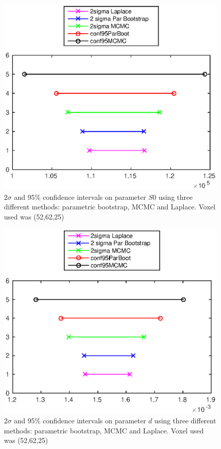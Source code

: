 \documentclass[11pt,a4paper,oneside]{report}
\begin{document}
\begin{figure}[H]
      \centering
    \includegraphics[scale=1]{figures/q2/q123-p1.eps}
    \caption{$2\sigma$ and 95\% confidence intervals on parameter $S0$ using three different methods: parametric bootstrap, MCMC and Laplace. Voxel used was (52,62,25) }
    \label{q121-p3}
\end{figure}

\begin{figure}[H]
      \centering
    \includegraphics[scale=1]{figures/q2/q123-p2.eps}
    \caption{$2\sigma$ and 95\% confidence intervals on parameter $d$ using three different methods: parametric bootstrap, MCMC and Laplace. Voxel used was (52,62,25) }
    \label{q121-p3}
\end{figure}
\end{document}
